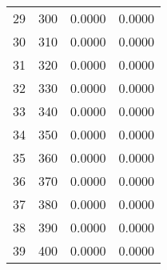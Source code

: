 \begin{table}[H]
\begin{tabular}{cccc}
\cline{1-4}
29 & 300 & 0.0000 & 0.0000 \\
\cline{1-4}
30 & 310 & 0.0000 & 0.0000 \\
\cline{1-4}
31 & 320 & 0.0000 & 0.0000 \\
\cline{1-4}
32 & 330 & 0.0000 & 0.0000 \\
\cline{1-4}
33 & 340 & 0.0000 & 0.0000 \\
\cline{1-4}
34 & 350 & 0.0000 & 0.0000 \\
\cline{1-4}
35 & 360 & 0.0000 & 0.0000 \\
\cline{1-4}
36 & 370 & 0.0000 & 0.0000 \\
\cline{1-4}
37 & 380 & 0.0000 & 0.0000 \\
\cline{1-4}
38 & 390 & 0.0000 & 0.0000 \\
\cline{1-4}
39 & 400 & 0.0000 & 0.0000 \\
\cline{1-4}
\end{tabular}
\end{table}
